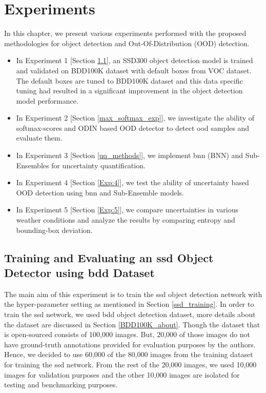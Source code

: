 

    \raggedbottom
    \justifying
    \chapter{Experiments}
    In this chapter, we present various experiments performed with the proposed methodologies for object detection and Out-Of-Distribution (OOD) detection.
    \begin{itemize}
        \item In Experiment 1 [Section \ref{Exp:1}], an SSD300 object detection model is trained and validated on BDD100K dataset with default boxes from VOC dataset. The default boxes are tuned to BDD100K dataset and this data specific tuning had resulted in  a significant improvement in the object detection model performance.
        
        \item In Experiment 2 [Section \ref{max_softmax_exp}], we investigate the ability of softmax-scores and ODIN based OOD detector to detect \acrshort{ood} samples and evaluate them.
        
        \item In Experiment 3 [Section \ref{uq_methods}], we implement \acrlong{bnn} (BNN) and Sub-Ensembles for uncertainty quantification.
        
        \item  In Experiment 4 [Section \ref{Exp:4}], we test the ability of uncertainty based OOD detection using \acrshort{bnn} and Sub-Ensemble models.
        
        \item In Experiment 5 [Section \ref{Exp:5}], we compare uncertainties in various weather conditions and analyze the results by comparing entropy and bounding-box deviation.
    \end{itemize}

    \section{Training and Evaluating an \acrshort{ssd} Object Detector using \acrshort{bdd} Dataset}
    \label{Exp:1}
    
    The main aim of this experiment is to train the \acrshort{ssd} object detection network with the hyper-parameter setting as mentioned in Section \ref{ssd_training}. In order to train the \acrshort{ssd} network, we used \acrshort{bdd} object detection dataset, more details about the dataset are discussed in Section \ref{BDD100K_about}. Though the dataset that is open-sourced consists of 100,000 images. But, 20,000 of those images do not have ground-truth annotations provided for evaluation purposes by the authors. Hence, we decided to use 60,000 of the 80,000 images from the training dataset for training the \acrshort{ssd} network. From the rest of the 20,000 images, we used 10,000 images for validation purposes and the other 10,000 images are isolated for testing and benchmarking purposes.
    
